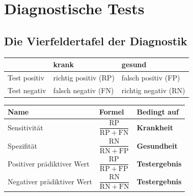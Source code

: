 \chapter{Diagnostische Tests}

\section{Die Vierfeldertafel der Diagnostik}

\begin{merksatz}
\begin{center}
{\small
\renewcommand{\arraystretch}{1.6}
\begin{tabular}{@{}P{2.2cm}P{2.6cm}P{2.6cm}@{}}
\toprule
& \textbf{krank} & \textbf{gesund}\\
\midrule
Test positiv & \textcolor{gruen}{richtig positiv} (RP) & \textcolor{akzent}{falsch positiv} (FP)\\
Test negativ & \textcolor{akzent}{falsch negativ} (FN) & \textcolor{gruen}{richtig negativ} (RN)\\
\bottomrule
\end{tabular}}
\end{center}

\begin{center}
\begin{minipage}{0.88\textwidth}
\end{minipage}
\end{center}
\end{merksatz}

\begin{definition}
\begin{center}
{\small
\renewcommand{\arraystretch}{1.65}
\begin{tabular}{@{}P{3.4cm}P{2.4cm}P{2.6cm}@{}}
\toprule
\textbf{Name} & \textbf{Formel} & \textbf{Bedingt auf}\\
\midrule
Sensitivität & $\dfrac{\mathrm{RP}}{\mathrm{RP}+\mathrm{FN}}$ & \textbf{Krankheit}\\[6pt]
Spezifität & $\dfrac{\mathrm{RN}}{\mathrm{RN}+\mathrm{FP}}$ & \textbf{Gesundheit}\\[6pt]
Positiver prädiktiver Wert & $\dfrac{\mathrm{RP}}{\mathrm{RP}+\mathrm{FP}}$ & \textbf{Testergebnis}\\[6pt]
Negativer prädiktiver Wert & $\dfrac{\mathrm{RN}}{\mathrm{RN}+\mathrm{FN}}$ & \textbf{Testergebnis}\\
\bottomrule
\end{tabular}}
\end{center}
\end{definition}

